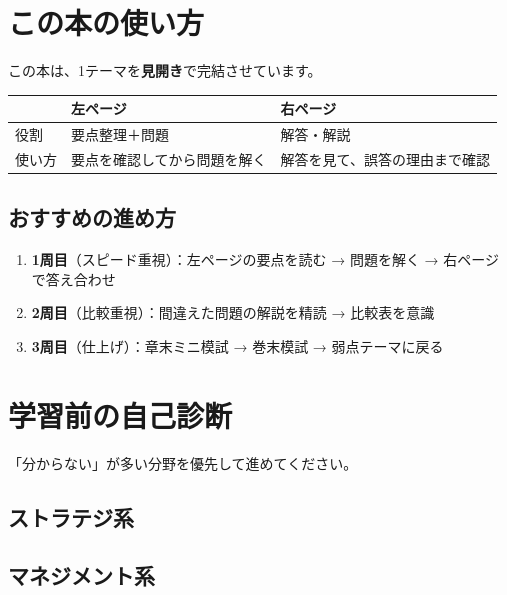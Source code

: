 \section{この本の使い方}

この本は、1テーマを\textbf{見開き}で完結させています。

\begin{center}
\begin{tabularx}{\textwidth}{lXX}
  \toprule
  & \textbf{左ページ} & \textbf{右ページ} \\
  \midrule
  役割 & 要点整理＋問題 & 解答・解説 \\
  使い方 & 要点を確認してから問題を解く & 解答を見て、誤答の理由まで確認 \\
  \bottomrule
\end{tabularx}
\end{center}

\subsection*{おすすめの進め方}

\begin{enumerate}
  \item \textbf{1周目}（スピード重視）：左ページの要点を読む → 問題を解く → 右ページで答え合わせ
  \item \textbf{2周目}（比較重視）：間違えた問題の解説を精読 → 比較表を意識
  \item \textbf{3周目}（仕上げ）：章末ミニ模試 → 巻末模試 → 弱点テーマに戻る
\end{enumerate}

\section{学習前の自己診断}

「分からない」が多い分野を優先して進めてください。

\subsection*{ストラテジ系}
\begin{itemize}
\end{itemize}

\subsection*{マネジメント系}
\begin{itemize}
\end{itemize}

